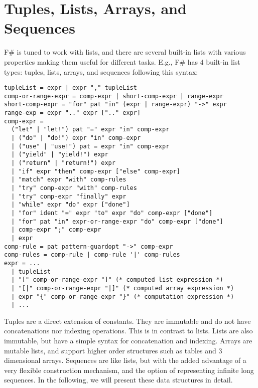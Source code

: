 \chapter{Tuples, Lists, Arrays, and Sequences}
\label{chap:lists}
F\# is tuned to work with lists, and there are several built-in lists with various properties making them useful for different tasks. E.g.,
%
%
F\# has 4 built-in list types: tuples, lists, arrays, and sequences following this syntax:
%
\begin{lstlisting}[language=ebnf]
tupleList = expr | expr "," tupleList
comp-or-range-expr = comp-expr | short-comp-expr | range-expr
short-comp-expr = "for" pat "in" (expr | range-expr) "->" expr
range-exp = expr ".." expr [".." expr]
comp-expr =
  ("let" | "let!") pat "=" expr "in" comp-expr
  | ("do" | "do!") expr "in" comp-expr
  | ("use" | "use!") pat = expr "in" comp-expr
  | ("yield" | "yield!") expr
  | ("return" | "return!") expr
  | "if" expr "then" comp-expr ["else" comp-expr]
  | "match" expr "with" comp-rules
  | "try" comp-expr "with" comp-rules
  | "try" comp-expr "finally" expr
  | "while" expr "do" expr ["done"]
  | "for" ident "=" expr "to" expr "do" comp-expr ["done"]
  | "for" pat "in" expr-or-range-expr "do" comp-expr ["done"]
  | comp-expr ";" comp-expr
  | expr
comp-rule = pat pattern-guardopt "->" comp-expr
comp-rules = comp-rule | comp-rule '|' comp-rules
expr = ... 
  | tupleList
  | "[" comp-or-range-expr "]" (* computed list expression *)
  | "[|" comp-or-range-expr "|]" (* computed array expression *)
  | expr "{" comp-or-range-expr "}" (* computation expression *)
  | ...
\end{lstlisting}
%
Tuples are a direct extension of constants. They are immutable and do not have concatenations nor indexing operations. This is in contrast to lists. Lists are also immutable, but have a simple syntax for concatenation and indexing. Arrays are mutable lists, and support higher order structures such as tables and 3 dimensional arrays. Sequences are like lists, but with the added advantage of a very flexible construction mechanism, and the option of representing infinite long sequences. In the following, we will present these data structures in detail.

